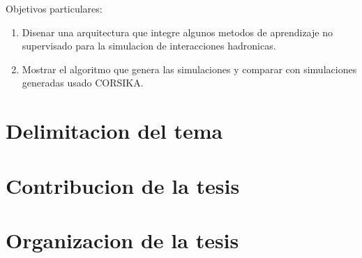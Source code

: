 Objetivos particulares:
\renewcommand{\theenumi}{\roman{enumi}}%
\begin{enumerate}
    \item Disenar una arquitectura que integre algunos metodos de aprendizaje no supervisado para la simulacion de interacciones hadronicas.
    \item Mostrar el algoritmo que genera las simulaciones y comparar con simulaciones generadas usado CORSIKA.
\end{enumerate}

\section{Delimitacion del tema}


\section{Contribucion de la tesis}


\section{Organizacion de la tesis}
